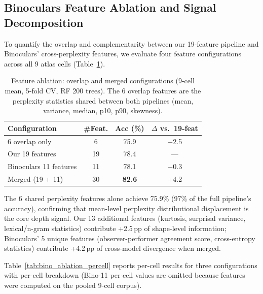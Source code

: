 \subsection{Binoculars Feature Ablation and Signal Decomposition}
\label{app:feature_ablation_bino}

To quantify the overlap and complementarity between our 19-feature pipeline and Binoculars' cross-perplexity features, we evaluate four feature configurations across all 9 atlas cells (Table~\ref{tab:bino_ablation}).

\begin{table}[h]
\centering
\small
\caption{Feature ablation: overlap and merged configurations (9-cell mean, 5-fold CV, RF 200 trees). The 6 overlap features are the perplexity statistics shared between both pipelines (mean, variance, median, p10, p90, skewness).}
\label{tab:bino_ablation}
\begin{tabular}{@{}lccc@{}}
\toprule
Configuration & \#Feat. & Acc (\%) & $\Delta$ vs.\ 19-feat \\
\midrule
6 overlap only & 6 & 75.9 & $-$2.5 \\
Our 19 features & 19 & 78.4 & --- \\
Binoculars 11 features & 11 & 78.1 & $-$0.3 \\
Merged (19 + 11) & 30 & \textbf{82.6} & +4.2 \\
\bottomrule
\end{tabular}
\end{table}

The 6 shared perplexity features alone achieve 75.9\% (97\% of the full pipeline's accuracy), confirming that mean-level perplexity distributional displacement is the core depth signal.
Our 13 additional features (kurtosis, surprisal variance, lexical/n-gram statistics) contribute +2.5\,pp of shape-level information; Binoculars' 5 unique features (observer-performer agreement score, cross-entropy statistics) contribute +4.2\,pp of cross-model divergence when merged.

Table~\ref{tab:bino_ablation_percell} reports per-cell results for three configurations with per-cell breakdown (Bino-11 per-cell values are omitted because features were computed on the pooled 9-cell corpus).

